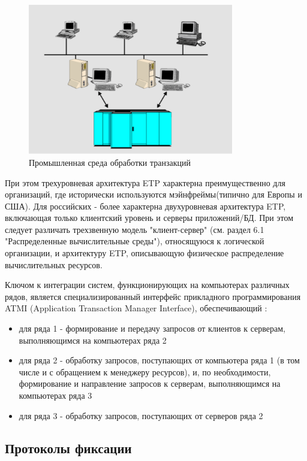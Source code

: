 \begin{figure}[h!]
    \centering
    \includegraphics[width=0.8\textwidth]{assets/distributed/ETP.png}
    \caption{Промышленная среда обработки транзакций}
\end{figure}

При этом трехуровневая архитектура ETP характерна преимущественно для организаций, где исторически используются мэйнфреймы(типично для Европы 
и США). Для российских - более характерна двухуровневая архитектура ETP, включающая только клиентский уровень и серверы приложений/БД. При 
этом следует различать трехзвенную модель "клиент-сервер" (см. раздел 6.1 "Распределенные вычислительные среды"), относящуюся к логической 
организации, и архитектуру ETP, описывающую физическое распределение вычислительных ресурсов.

Ключом к интеграции систем, функционирующих на компьютерах различных рядов, является специализированный
интерфейс прикладного программирования ATMI (Application Transaction Manager Interface), обеспечивающий \autocite{TransactionMonitors}:
\begin{itemize}
    \item для ряда 1 - формирование и передачу запросов от клиентов к серверам, выполняющимся на компьютерах ряда 2
    \item для ряда 2 - обработку запросов, поступающих от компьютера ряда 1 (в том числе и с
    обращением к менеджеру ресурсов), и, по необходимости, формирование и направление
    запросов к серверам, выполняющимся на компьютерах ряда 3
    \item для ряда 3 - обработку запросов, поступающих от серверов ряда 2
\end{itemize}

\subsection{Протоколы фиксации}

